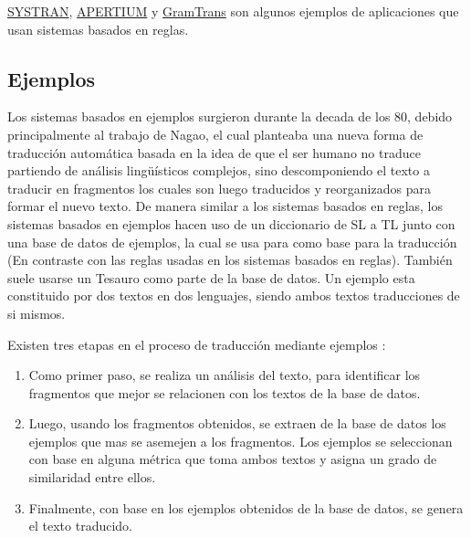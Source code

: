 \documentclass[12pt, letterpaper]{article}
\begin{document}
\begin{multicols}{2}
                
                \href{https://www.systransoft.com/} {SYSTRAN}, \href{https://www.apertium.org}{APERTIUM} y \href{https://gramtrans.com}{GramTrans}
                son algunos ejemplos de aplicaciones que usan sistemas basados en reglas.
                
                
            \subsection{Ejemplos}
                Los sistemas basados en ejemplos surgieron durante la decada de los 80, debido principalmente al trabajo de Nagao\cite{Nagao}, el cual planteaba
                una nueva forma de traducción automática basada en la idea de que el ser humano no traduce partiendo de análisis lingüísticos complejos, sino
                descomponiendo el texto a traducir en fragmentos los cuales son luego traducidos y reorganizados para formar el nuevo texto. De manera similar 
                a los sistemas basados en reglas, los sistemas basados en ejemplos hacen uso de un diccionario de SL a TL junto con una base de datos de ejemplos, 
                la cual se usa para como base para la traducción (En contraste con las reglas usadas en los sistemas basados en reglas). También suele usarse un 
                Tesauro como parte de la base de datos. Un ejemplo esta constituido por dos textos en dos lenguajes, siendo ambos textos traducciones de si mismos\cite{Haihua}.
                
                Existen tres etapas en el proceso de traducción mediante ejemplos \cite{Nagao}\cite{Sumita2005TranslatingWE}:
                \begin{enumerate}
                    \item Como primer paso, se realiza un análisis del texto, para identificar los fragmentos que mejor se relacionen con los textos de la base de
                    datos.
                    \item Luego, usando los fragmentos obtenidos, se extraen de la base de datos los ejemplos que mas se asemejen a los fragmentos. Los ejemplos se
                    seleccionan con base en alguna métrica que toma ambos textos y asigna un grado de similaridad entre ellos.  
                    \item Finalmente, con base en los ejemplos obtenidos de la base de datos, se genera el texto traducido.
                \end{enumerate}


\end{multicols}
\end{document}
